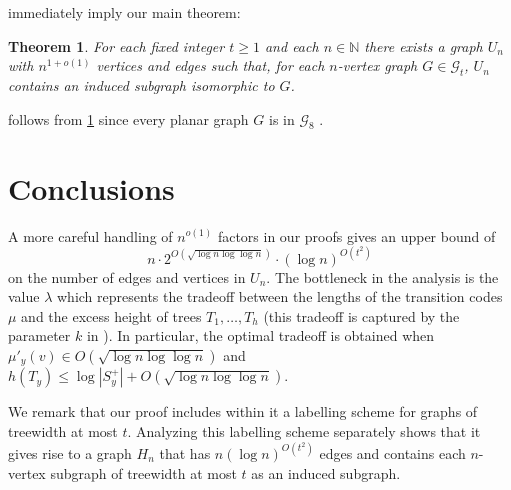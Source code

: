 \documentclass{patmorin}
\newcommand{\N}{\mathbb{N}}
\newtheorem{theorem}{Theorem}
\begin{document}
 immediately imply our main theorem:

\begin{theorem}\label{main}
    For each fixed integer $t\ge 1$ and each $n\in \N$ there exists a graph $U_n$ with $n^{1+o(1)}$ vertices and edges such that, for each $n$-vertex graph $G\in \mathcal{G}_t$, $U_n$ contains an induced subgraph isomorphic to $G$.
\end{theorem}

 follows from \cref{main} since every planar graph $G$ is in $\mathcal{G}_8$ \cite[Theorem~36]{dujmovic.joret.ea:planar}.

\section{Conclusions}
\label{summary}

A more careful handling of $n^{o(1)}$ factors in our proofs gives an upper bound of
\[
    n\cdot 2^{O(\sqrt{\log n\log\log n})}\cdot (\log n)^{O(t^2)}
\]
on the number of edges and vertices in $U_n$.  The bottleneck in the analysis is the value $\lambda$ which represents the tradeoff between the lengths of the transition codes $\mu$ and the excess height of trees $T_1,\ldots,T_h$ (this tradeoff is captured by the parameter $k$ in \cite{dujmovic.esperet.ea:adjacency}).  In particular, the optimal tradeoff is obtained when $\mu'_y(v)\in O(\sqrt{\log n\log\log n})$ and $h(T_y)\le \log |S^+_y| + O(\sqrt{\log n\log\log n})$.

We remark that our proof includes within it a labelling scheme for graphs of treewidth at most $t$.  Analyzing this labelling scheme separately shows that it gives rise to a graph $H_n$ that has $n(\log n)^{O(t^2)}$ edges and contains each $n$-vertex subgraph of treewidth at most $t$ as an induced subgraph.



\end{document}

